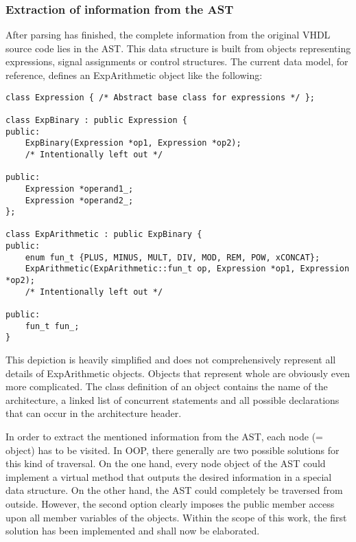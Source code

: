 \subsubsection{Extraction of information from the AST}
After parsing has
finished, the complete information from the original VHDL source code
lies in the AST. This data structure is built from objects
representing expressions, signal assignments or control
structures. The current data model, for reference, defines an
ExpArithmetic object like the following:
%
\begin{lstlisting}[style=c++]
class Expression { /* Abstract base class for expressions */ };

class ExpBinary : public Expression {
public:
    ExpBinary(Expression *op1, Expression *op2);
    /* Intentionally left out */

public:
    Expression *operand1_;
    Expression *operand2_;
};

class ExpArithmetic : public ExpBinary {
public:
    enum fun_t {PLUS, MINUS, MULT, DIV, MOD, REM, POW, xCONCAT};
    ExpArithmetic(ExpArithmetic::fun_t op, Expression *op1, Expression *op2);
    /* Intentionally left out */

public:
    fun_t fun_;
}
\end{lstlisting}
%
This depiction is heavily simplified and does not comprehensively
represent all details of ExpArithmetic objects. Objects that represent
whole  are obviously even more complicated. The
class definition of an  object contains the name of
the architecture, a linked list of concurrent statements and all
possible declarations that can occur in the architecture header.

In order to extract the mentioned information from the AST, each node
(= object) has to be visited. In OOP, there generally are two possible
solutions for this kind of traversal. On the one hand, every node
object of the AST could implement a virtual method that outputs the
desired information in a special data structure. On the other hand,
the AST could completely be traversed from outside. However, the
second option clearly imposes the public member access upon all member
variables of the objects. Within the scope of this work, the first
solution has been implemented and shall now be elaborated.

